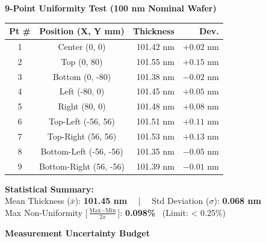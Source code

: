\documentclass[10pt,a4paper]{scrartcl}
\begin{document}
\begin{tcolorbox}[sectionbox, title={\faChartBar\ SECTION 5: 200mm WAFER UNIFORMITY MAP \& UNCERTAINTY BUDGET}]
\begin{minipage}[t]{0.51\textwidth}
  \textbf{\small 9-Point Uniformity Test (100 nm Nominal Wafer)}
  \vspace{3pt}

  \small
  \begin{tabularx}{\textwidth}{@{}c c r r@{}}
    \toprule
    \textbf{Pt \#} & \textbf{Position (X, Y mm)} & \textbf{Thickness} & \textbf{Dev.} \\
    \midrule
    \rowcolor{TableAlt}
    1 & Center (0, 0) & 101.42 nm & $+0.02$ nm \\
    2 & Top (0, 80) & 101.55 nm & $+0.15$ nm \\
    \rowcolor{TableAlt}
    3 & Bottom (0, -80) & 101.38 nm & $-0.02$ nm \\
    4 & Left (-80, 0) & 101.45 nm & $+0.05$ nm \\
    \rowcolor{TableAlt}
    5 & Right (80, 0) & 101.48 nm & $+0.08$ nm \\
    6 & Top-Left (-56, 56) & 101.51 nm & $+0.11$ nm \\
    \rowcolor{TableAlt}
    7 & Top-Right (56, 56) & 101.53 nm & $+0.13$ nm \\
    8 & Bottom-Left (-56, -56) & 101.35 nm & $-0.05$ nm \\
    \rowcolor{TableAlt}
    9 & Bottom-Right (56, -56) & 101.39 nm & $-0.01$ nm \\
    \bottomrule
  \end{tabularx}
  \vspace{3pt}
  
  \begin{tcolorbox}[colback=CleanroomLight, colframe=BorderGrey, boxrule=0.5pt, arc=2pt, left=4pt, right=4pt, top=3pt, bottom=3pt]
    \scriptsize
    \textbf{Statistical Summary:}\\[1pt]
    Mean Thickness ($\bar{x}$): \textbf{101.45 nm} ~~|~~ Std Deviation ($\sigma$): \textbf{0.068 nm}\\
    Max Non-Uniformity [$\frac{\text{Max}-\text{Min}}{2\bar{x}}$]: \textbf{0.098\%} ~(Limit: \textless{} 0.25\%)
  \end{tcolorbox}
\end{minipage}%
\hfill
\begin{minipage}[t]{0.46\textwidth}
  \textbf{\small Measurement Uncertainty Budget}
  \vspace{3pt}


\end{minipage}
\end{tcolorbox}
\end{document}
